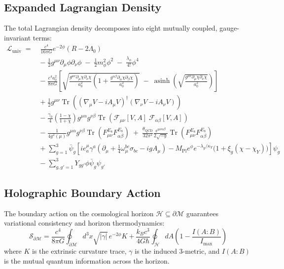 \documentclass[11pt,a4paper]{article}
\begin{document}
\subsection{Expanded Lagrangian Density}
The total Lagrangian density decomposes into eight mutually coupled, gauge-invariant terms:
\begin{align}
\mathcal{L}_{\mathrm{univ}} \;=\;& \frac{c^4}{16\pi G} e^{-2\phi} \left( R - 2\Lambda_0 \right) \label{eq:grav}\\
&-\; \frac{1}{2} g^{\mu\nu} \partial_\mu\phi \partial_\nu\phi \;-\; \frac{1}{2} m_\phi^2 \phi^2 \;-\; \frac{\lambda_\phi}{4!} \phi^4 \label{eq:dilaton}\\
&-\; \frac{c^4 a_0^2}{8\pi G} \left[ \sqrt{\frac{g^{\mu\nu}\partial_\mu\chi\partial_\nu\chi}{a_0^2}\left(1 + \frac{g^{\alpha\beta}\partial_\alpha\chi\partial_\beta\chi}{a_0^2}\right)} \;-\; \operatorname{asinh}\left(\sqrt{\frac{g^{\mu\nu}\partial_\mu\chi\partial_\nu\chi}{a_0^2}}\right) \right] \label{eq:aqual}\\
&+\; \frac{1}{2} g^{\mu\nu} \operatorname{Tr}\left( (\nabla_\mu V - i A_\mu V)^\dagger (\nabla_\nu V - i A_\nu V) \right) \label{eq:stiefel_kin}\\
&-\; \frac{\gamma_0}{4}\left(\frac{1-\chi}{1+\chi}\right) g^{\mu\alpha} g^{\nu\beta} \operatorname{Tr}\left( \mathcal{F}_{\mu\nu}[V,A] \; \mathcal{F}_{\alpha\beta}[V,A] \right) \label{eq:stiefel_curv}\\
&-\; \frac{1}{4 g^2(\mu)} g^{\mu\alpha} g^{\nu\beta} \operatorname{Tr}\left( F_{\mu\nu}^{E_8} F_{\alpha\beta}^{E_8} \right) \;+\; \frac{\theta_{\mathrm{QCD}}}{32\pi^2} \frac{\epsilon^{\mu\nu\alpha\beta}}{2\sqrt{-g}} \operatorname{Tr}\left( F_{\mu\nu}^{E_8} F_{\alpha\beta}^{E_8} \right) \label{eq:ym}\\
&+\; \sum_{g=1}^3 \bar{\psi}_g \left[ i e^\mu_a \gamma^a \left( \partial_\mu + \frac{1}{4}\omega_\mu^{bc}\sigma_{bc} - i g A_\mu \right) - M_{\mathrm{Pl}} e^\phi e^{-\lambda_g/\kappa_Y} \big(1 + \xi_g(\chi - \chi_Y)\big) \right] \psi_g \label{eq:fermion}\\
&-\; \sum_{g, g'=1}^3 Y_{gg'} \phi \bar{\psi}_g \psi_{g'} \label{eq:yukawa}
\end{align}

\subsection{Holographic Boundary Action}
The boundary action on the cosmological horizon $\mathcal{H} \subseteq \partial\mathcal{M}$ guarantees variational consistency and horizon thermodynamics:
\begin{equation}
\mathcal{S}_{\partial\mathcal{M}} = \frac{c^4}{8\pi G} \oint_{\partial\mathcal{M}} d^3x \sqrt{|\gamma|} \, e^{-2\phi} K + \frac{k_B c^3}{4 G \hbar} \oint_{\mathcal{H}} dA \left( 1 - \frac{I(A:B)}{I_{\max}} \right)
\end{equation}
where $K$ is the extrinsic curvature trace, $\gamma$ is the induced 3-metric, and $I(A:B)$ is the mutual quantum information across the horizon.
\end{document}
